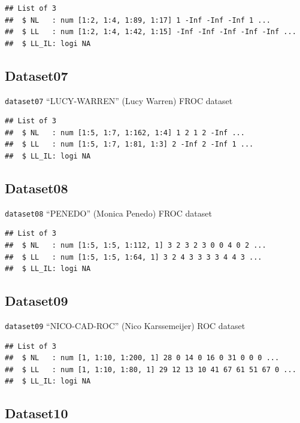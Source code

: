 \documentclass[
]{book}
\begin{document}
\begin{verbatim}
## List of 3
##  $ NL   : num [1:2, 1:4, 1:89, 1:17] 1 -Inf -Inf -Inf 1 ...
##  $ LL   : num [1:2, 1:4, 1:42, 1:15] -Inf -Inf -Inf -Inf -Inf ...
##  $ LL_IL: logi NA
\end{verbatim}

\hypertarget{datasets-dataset07}{%
\subsection{Dataset07}\label{datasets-dataset07}}

\texttt{dataset07} ``LUCY-WARREN'' (Lucy Warren) FROC dataset \citep{RN2507}

\begin{verbatim}
## List of 3
##  $ NL   : num [1:5, 1:7, 1:162, 1:4] 1 2 1 2 -Inf ...
##  $ LL   : num [1:5, 1:7, 1:81, 1:3] 2 -Inf 2 -Inf 1 ...
##  $ LL_IL: logi NA
\end{verbatim}

\hypertarget{datasets-dataset08}{%
\subsection{Dataset08}\label{datasets-dataset08}}

\texttt{dataset08} ``PENEDO'' (Monica Penedo) FROC dataset \citep{RN1520}

\begin{verbatim}
## List of 3
##  $ NL   : num [1:5, 1:5, 1:112, 1] 3 2 3 2 3 0 0 4 0 2 ...
##  $ LL   : num [1:5, 1:5, 1:64, 1] 3 2 4 3 3 3 3 4 4 3 ...
##  $ LL_IL: logi NA
\end{verbatim}

\hypertarget{datasets-dataset09}{%
\subsection{Dataset09}\label{datasets-dataset09}}

\texttt{dataset09} ``NICO-CAD-ROC'' (Nico Karssemeijer) ROC dataset \citep{hupse2013standalone}

\begin{verbatim}
## List of 3
##  $ NL   : num [1, 1:10, 1:200, 1] 28 0 14 0 16 0 31 0 0 0 ...
##  $ LL   : num [1, 1:10, 1:80, 1] 29 12 13 10 41 67 61 51 67 0 ...
##  $ LL_IL: logi NA
\end{verbatim}

\hypertarget{datasets-dataset10}{%
\subsection{Dataset10}\label{datasets-dataset10}}
\end{document}
